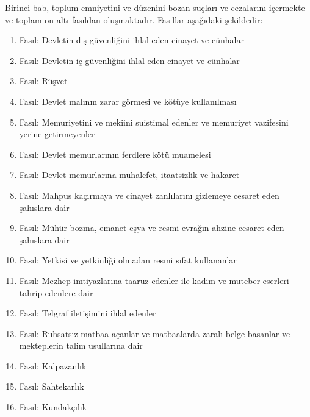 Birinci bab, toplum emniyetini ve düzenini bozan suçları ve cezalarını içermekte ve toplam on altı fasıldan oluşmaktadır. Fasıllar aşağıdaki şekildedir:
\begin{enumerate}
    \item Fasıl: Devletin dış güvenliğini ihlal eden cinayet ve cünhalar
    \item Fasıl: Devletin iç güvenliğini ihlal eden cinayet ve cünhalar
    \item Fasıl: Rüşvet
    \item Fasıl: Devlet malının zarar görmesi ve kötüye kullanılması
    \item Fasıl: Memuriyetini ve mekiini suistimal edenler ve memuriyet vazifesini yerine getirmeyenler
    \item Fasıl: Devlet memurlarının ferdlere kötü muamelesi
    \item Fasıl: Devlet memurlarına muhalefet, itaatsizlik ve hakaret
    \item Fasıl: Mahpus kaçırmaya ve cinayet zanlılarını gizlemeye cesaret eden şahıslara dair
    \item Fasıl: Mühür bozma, emanet eşya ve resmi evrağın ahzine cesaret eden şahıslara dair
    \item Fasıl: Yetkisi ve yetkinliği olmadan resmi sıfat kullananlar
    \item Fasıl: Mezhep imtiyazlarına taaruz edenler ile kadim ve muteber eserleri tahrip edenlere dair
    \item Fasıl: Telgraf iletişimini ihlal edenler
    \item Fasıl: Ruhsatsız matbaa açanlar ve matbaalarda zaralı belge basanlar ve mekteplerin talim usullarına dair
    \item Fasıl: Kalpazanlık
    \item Fasıl: Sahtekarlık
    \item Fasıl: Kundakçılık
\end{enumerate}

